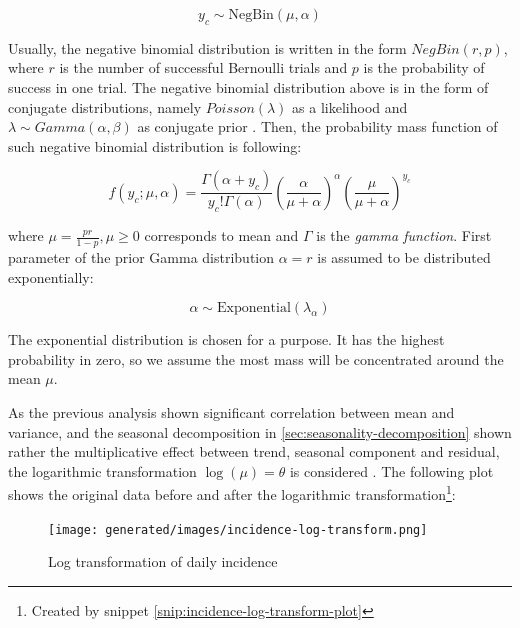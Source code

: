 \documentclass[
  digital, %
  oneside, %
  lof,     %
  lot,     %
]{fithesis4}
\begin{document}
\begin{equation}
y_c \sim \text{NegBin}\left( \mu, \alpha \right)
\end{equation}

Usually, the negative binomial distribution is written in the form $NegBin \left( r, p \right)$, where $r$ is the number of successful Bernoulli trials and $p$ is the probability of success in one trial.
The negative binomial distribution above is in the form of conjugate distributions, namely $Poisson\left( \lambda \right)$ as a likelihood and $\lambda \sim Gamma\left( \alpha, \beta \right)$ as conjugate prior \cite{munezero2020}.
Then, the probability mass function of such negative binomial distribution is following:

\begin{equation}
f \left( y_c; \mu, \alpha \right) = \frac{\Gamma \left( \alpha + y_c \right) }{y_c! \Gamma \left( \alpha \right)} \left( \frac{\alpha}{\mu + \alpha} \right)^{\alpha} \left( \frac{\mu}{\mu + \alpha} \right)^{y_c}
\end{equation}

where $\mu = \frac{pr}{1-p}, \mu \geq 0$ corresponds to mean and $\Gamma$ is the \textit{gamma function}. 
First parameter of the prior Gamma distribution $\alpha = r$ is assumed to be distributed exponentially:

\begin{equation}\label{eq:alpha-prior}
	\alpha \sim \text{Exponential} \left( \lambda_{\alpha} \right)
\end{equation}

The exponential distribution is chosen for a purpose.
It has the highest probability in zero, so we assume the most mass will be concentrated around the mean $\mu$.

As the previous analysis shown significant correlation between mean and variance, and the seasonal decomposition in \autoref{sec:seasonality-decomposition} shown rather the multiplicative effect between trend, seasonal component and residual, the logarithmic transformation $\log \left( \mu \right) = \theta$ is considered \cite{cialdella2020}.
The following plot shows the original data before and after the logarithmic transformation\footnote{Created by snippet \ref{snip:incidence-log-transform-plot}}:

\begin{figure}[H]
  \begin{center}
    \texttt{[image: generated/images/incidence-log-transform.png]}
  \end{center}
  \caption{Log transformation of daily incidence}
  \label{fig:incidence-log-transform}
\end{figure}
\end{document}

